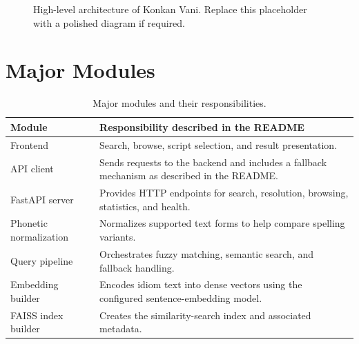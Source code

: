 \documentclass[12pt,a4paper]{report}
\begin{document}
\begin{figure}[ht]
    \centering
    \caption{High-level architecture of Konkan Vani. Replace this placeholder with
    a polished diagram if required.}
    \label{fig:architecture}
\end{figure}

\section{Major Modules}

\begin{table}[ht]
    \centering
    \begin{tabularx}{\textwidth}{p{3.8cm}X}
        \toprule
        \textbf{Module} & \textbf{Responsibility described in the README}\\
        \midrule
        Frontend & Search, browse, script selection, and result presentation.\\
        API client & Sends requests to the backend and includes a fallback
                     mechanism as described in the README.\\
        FastAPI server & Provides HTTP endpoints for search, resolution, browsing,
                         statistics, and health.\\
        Phonetic normalization & Normalizes supported text forms to help compare
                                 spelling variants.\\
        Query pipeline & Orchestrates fuzzy matching, semantic search, and fallback
                         handling.\\
        Embedding builder & Encodes idiom text into dense vectors using the
                            configured sentence-embedding model.\\
        FAISS index builder & Creates the similarity-search index and associated
                              metadata.\\
        \bottomrule
    \end{tabularx}
    \caption{Major modules and their responsibilities.}
    \label{tab:modules}
\end{table}
\end{document}

